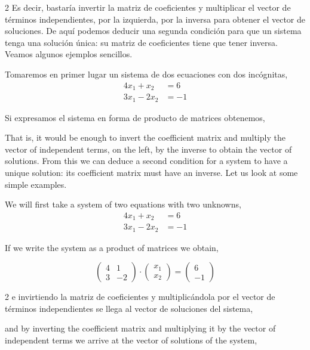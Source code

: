 \begin{paracol}{2}
Es decir, bastaría invertir la matriz de coeficientes y multiplicar el vector de términos independientes, por la izquierda, por la inversa para obtener el vector de soluciones. De aquí podemos deducir una segunda condición para que un sistema tenga una solución única: su matriz de coeficientes tiene que tener inversa. Veamos algunos ejemplos sencillos.

Tomaremos en primer lugar un sistema de dos ecuaciones con dos incógnitas,
\begin{align*}
4x_1+x_2&=6\\
3x_1-2x_2&=-1
\end{align*}

Si expresamos el sistema en forma de producto de matrices obtenemos,

\switchcolumn

That is, it would be enough to invert the coefficient matrix and multiply the vector of independent terms, on the left, by the inverse to obtain the vector of solutions. From this we can deduce a second condition for a system to have a unique solution: its coefficient matrix must have an inverse. Let us look at some simple examples.

We will first take a system of two equations with two unknowns,
\begin{align*}
4x_1+x_2&=6 \\
3x_1-2x_2&=-1
\end{align*}

If we write the system as a product of matrices we obtain,

\end{paracol}

\begin{equation*}
\begin{pmatrix}
4& 1\\
3& -2
\end{pmatrix} \cdot \begin{pmatrix}
x_1\\
x_2
\end{pmatrix}=\begin{pmatrix}
6\\
-1
\end{pmatrix}
\end{equation*}

\begin{paracol}{2}
e invirtiendo la matriz de coeficientes y multiplicándola por el vector de términos independientes se llega al vector de soluciones del sistema,

\switchcolumn
and by inverting the coefficient matrix and multiplying it by the vector of independent terms we arrive at the vector of solutions of the system,

\end{paracol}

